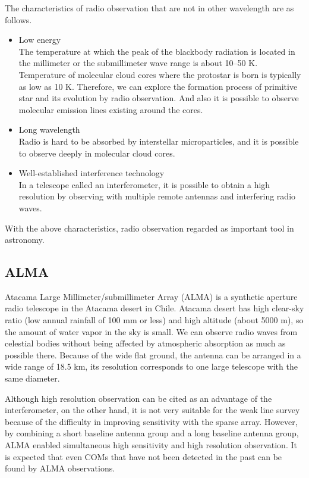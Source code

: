 The characteristics of radio observation that are not in other wavelength are as follows.\begin{itemize}
\item Low energy\\
The temperature at which the peak of the blackbody radiation is located in the millimeter or the submillimeter wave range is about 10--50 K.
Temperature of molecular cloud cores where the protostar is born is typically as low as 10 K. 
Therefore, we can explore the formation process of primitive star and its evolution by radio observation. 
And also it is possible to observe molecular emission lines existing around the cores.

\item Long wavelength\\
Radio is hard to be absorbed by interstellar microparticles, and it is possible to observe deeply in molecular cloud cores.

\item Well-established interference technology\\
In a telescope called an interferometer, it is possible to obtain a high resolution by observing 
with multiple remote antennas and interfering radio waves. 
\end{itemize}

With the above characteristics, radio observation regarded as important tool in astronomy.

\subsection{ALMA}
Atacama Large Millimeter/submillimeter Array (ALMA) is a synthetic aperture radio telescope 
in the Atacama desert in Chile.
Atacama desert has  high clear-sky ratio (low annual rainfall of 100 mm or less) and 
high altitude (about 5000 m), so the amount of water vapor in the sky is small. 
We can observe radio waves from celestial bodies without being affected by atmospheric 
absorption as much as possible there.
Because of the wide flat ground, the antenna can be arranged in a wide range of 18.5 km, 
its resolution corresponds to one large telescope with the same diameter.

Although high resolution observation can be cited as an advantage of the interferometer, 
on the other hand, it is not very suitable for the weak line survey because of the difficulty in improving sensitivity with the sparse array. 
However, by combining a short baseline antenna group and a long baseline antenna group,
ALMA enabled simultaneous high sensitivity and high resolution observation. 
It is expected that even COMs that have not been detected in the past can be found by ALMA observations.

